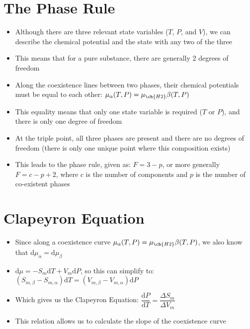 \documentclass[12pt, openany, letterpaper]{memoir}
\begin{document}
\section*{The Phase Rule}
\begin{itemize}
	\item Although there are three relevant state variables ($T$, $P$, and $V$), we can describe the chemical potential and the state with any two of the three
	\item This means that for a pure substance, there are generally 2 degrees of freedom
	\item Along the coexistence lines between two phases, their chemical potentials must be equal to each other: $\mu_\alpha(T,P)=\mu_{\ch{H2}}\beta(T,P)$
	\item This equality means that only one state variable is required ($T$ or $P$), and there is only one degree of freedom
	\item At the triple point, all three phases are present and there are no degrees of freedom (there is only one unique point where this composition exists)
	\item This leads to the phase rule, given as: $F=3-p$, or more generally $F=c-p+2$, where $c$ is the number of components and $p$ is the number of co-existent phases
\end{itemize}
\section*{Clapeyron Equation}
\begin{itemize}
	\item Since along a coexistence curve $\mu_\alpha(T,P)=\mu_{\ch{H2}}\beta(T,P)$, we also know that $\mathrm{d}\mu_\alpha = \mathrm{d}\mu_\beta$
	\item $\mathrm{d}\mu = -S_m\mathrm{d}T + V_m\mathrm{d}P$, so this can simplify to: $\left(S_{m,\beta}-S_{m,\alpha}\right)\mathrm{d}T = \left(V_{m,\beta}-V_{m,\alpha}\right)\mathrm{d}P$
	\item Which gives us the Clapeyron Equation: $\dfrac{\mathrm{d}P}{\mathrm{d}T}=\dfrac{\Delta S_m}{\Delta V_m}$
	\item This relation allows us to calculate the slope of the coexistence curve
\end{itemize}
\end{document}
